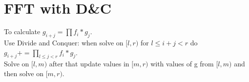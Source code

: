 \section{FFT with D\&C}

To calculate $g_{i + j} = \prod f_i * g_j$.\\

Use Divide and Conquer: when solve on $[l, r)$ for $l \le i + j < r$ do $g_{i + j} += \prod_{l \le j < r} f_i * g_j$.\\

Solve on $[l, m)$ after that update values in $[m, r)$ with values of g from $[l, m)$ and then solve on $[m, r)$. 

